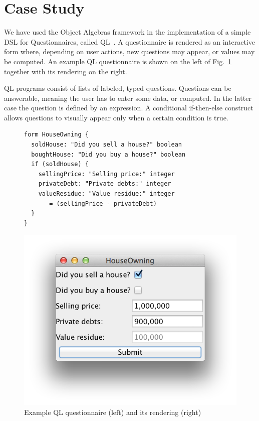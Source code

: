 \section{Case Study}

We have used the Object Algebras framework in the implementation of a simple DSL for Questionnaires, called QL~\cite{gouseti14extensible}.
A questionnaire is rendered as an interactive form where, depending on user actions, new questions may appear, or values may be computed.
An example QL questionnaire is shown on the left of Fig.~\ref{FIG:houseowning} together with its rendering on the right.

QL programs consist of lists of labeled, typed questions.
Questions can be answerable, meaning the user has to enter some data, or computed.
In the latter case the question is defined by an expression.
A conditional if-then-else construct allows questions to visually appear only when a certain condition is true.

\begin{figure}[t]
\hspace*{-5pt}\begin{minipage}{0.6\linewidth}
\begin{lstlisting}[language=ql]
form HouseOwning {
  soldHouse: "Did you sell a house?" boolean
  boughtHouse: "Did you buy a house?" boolean
  if (soldHouse) {
    sellingPrice: "Selling price:" integer
    privateDebt: "Private debts:" integer
    valueResidue: "Value residue:" integer 
       = (sellingPrice - privateDebt)
  }
}
\end{lstlisting}
\end{minipage}
\begin{minipage}{0.5\linewidth}
  \includegraphics[width=\linewidth]{sections/screenshot}
\end{minipage}
\caption{Example QL questionnaire (left) and its rendering (right)}
\label{FIG:houseowning}
\end{figure}


